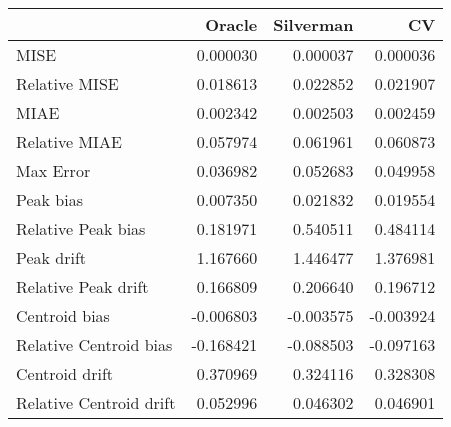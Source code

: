 \begin{tabular}{lrrr}
  \hline
 & Oracle & Silverman & CV \\ 
  \hline
MISE & 0.000030 & 0.000037 & 0.000036 \\ 
  Relative MISE & 0.018613 & 0.022852 & 0.021907 \\ 
  MIAE & 0.002342 & 0.002503 & 0.002459 \\ 
  Relative MIAE & 0.057974 & 0.061961 & 0.060873 \\ 
  Max Error & 0.036982 & 0.052683 & 0.049958 \\ 
  Peak bias & 0.007350 & 0.021832 & 0.019554 \\ 
  Relative Peak bias & 0.181971 & 0.540511 & 0.484114 \\ 
  Peak drift & 1.167660 & 1.446477 & 1.376981 \\ 
  Relative Peak drift & 0.166809 & 0.206640 & 0.196712 \\ 
  Centroid bias & -0.006803 & -0.003575 & -0.003924 \\ 
  Relative Centroid bias & -0.168421 & -0.088503 & -0.097163 \\ 
  Centroid drift & 0.370969 & 0.324116 & 0.328308 \\ 
  Relative Centroid drift & 0.052996 & 0.046302 & 0.046901 \\ 
   \hline
\end{tabular}
